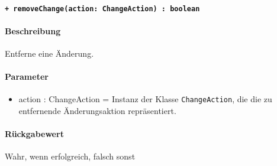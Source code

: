 \paragraph{\texttt{+ removeChange(action: ChangeAction) : boolean}}\label{AP_Changes_removeChange}%
\paragraph*{Beschreibung}
Entferne eine Änderung.
\paragraph*{Parameter}
\begin{itemize}
    \item action : ChangeAction = Instanz der Klasse \verb#ChangeAction#, die die zu entfernende Änderungsaktion repräsentiert.
\end{itemize}
\paragraph*{Rückgabewert}
Wahr, wenn erfolgreich, falsch sonst